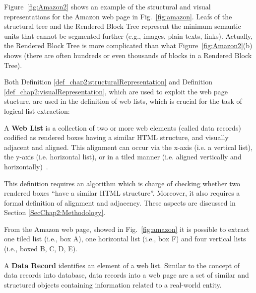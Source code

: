  
Figure~\ref{fig:Amazon2} shows an example of the structural and visual representations for the Amazon web page in Fig.~\ref{fig:amazon}. Leafs of the structural tree and the Rendered Block Tree represent the minimum semantic units that cannot be segmented further (e.g., images, plain texts, links).
Actually, the Rendered Block Tree is more complicated than what Figure~\ref{fig:Amazon2}(b) shows (there are often hundreds or even thousands of blocks in a Rendered Block Tree). 


Both Definition \ref{def_chap2:structuralRepresentation} and Definition \ref{def_chap2:visualRepresentation}, which are used to exploit the web page stucture, are used in the definition of web lists, which is crucial for the task of logical list extraction:

\begin{definition}
\label{def_chap2:list}
A \textbf{Web List} is a collection of two or more web elements (called data records) codified as rendered boxes having a similar HTML structure, and visually adjacent and aligned. This alignment can occur via the x-axis (i.e. a vertical list), the y-axis (i.e. horizontal list), or in a tiled manner (i.e. aligned vertically and horizontally)~\cite{Lanotte:2014}. 
\end{definition}

This definition requires an algorithm which is charge of checking whether two rendered boxes ``have a similar HTML structure''. Moreover, it also requires a formal definition of alignment and adjacency. These aspects are discussed in Section \ref{SecChap2:Methodology}.

From the Amazon web page, showed in Fig.~\ref{fig:amazon} it is possible to extract one tiled list (i.e., box A), one horizontal list (i.e., box F) and four vertical lists (i.e., boxed B, C, D, E). 

\begin{definition}
A \textbf{Data Record} identifies an element of a web list. Similar to the concept of data records into database, data records into a web page are a set of similar and structured objects containing information related to a real-world entity. 
\end{definition}

